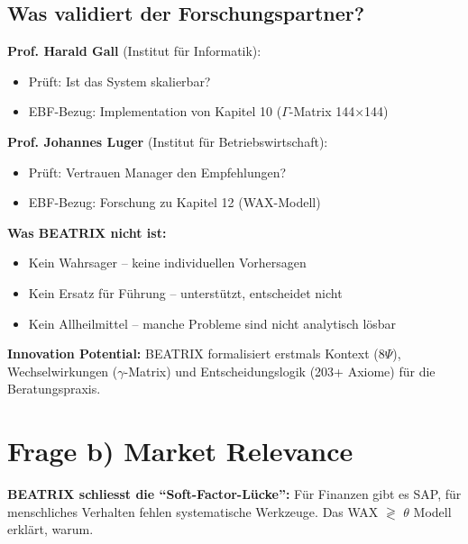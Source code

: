\documentclass[11pt,a4paper]{article}
\begin{document}
\subsection{Was validiert der Forschungspartner?}

\textbf{Prof. Harald Gall} (Institut für Informatik):
\begin{itemize}[nosep]
    \item Prüft: Ist das System skalierbar?
    \item EBF-Bezug: Implementation von Kapitel 10 ($\Gamma$-Matrix 144×144)
\end{itemize}

\textbf{Prof. Johannes Luger} (Institut für Betriebswirtschaft):
\begin{itemize}[nosep]
    \item Prüft: Vertrauen Manager den Empfehlungen?
    \item EBF-Bezug: Forschung zu Kapitel 12 (WAX-Modell)
\end{itemize}

\begin{limitbox}
\textbf{Was BEATRIX nicht ist:}
\begin{itemize}[nosep]
    \item Kein Wahrsager -- keine individuellen Vorhersagen
    \item Kein Ersatz für Führung -- unterstützt, entscheidet nicht
    \item Kein Allheilmittel -- manche Probleme sind nicht analytisch lösbar
\end{itemize}
\end{limitbox}

\begin{summarybox}
\textbf{Innovation Potential:} BEATRIX formalisiert erstmals Kontext (8$\Psi$), Wechselwirkungen ($\gamma$-Matrix) und Entscheidungslogik (203+ Axiome) für die Beratungspraxis.
\end{summarybox}

\newpage


\section{Frage b) Market Relevance}

\begin{keyinsight}
\textbf{BEATRIX schliesst die ``Soft-Factor-Lücke'':} Für Finanzen gibt es SAP, für menschliches Verhalten fehlen systematische Werkzeuge. Das WAX $\gtrless$ $\theta$ Modell erklärt, warum.
\end{keyinsight}
\end{document}
